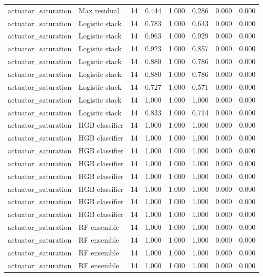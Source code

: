 {\begin{longtable}{llrrrrrr}
actuator\_saturation & Max residual & 14 & 0.444 & 1.000 & 0.286 & 0.000 & 0.000 \\
actuator\_saturation & Logistic stack & 14 & 0.783 & 1.000 & 0.643 & 0.000 & 0.000 \\
actuator\_saturation & Logistic stack & 14 & 0.963 & 1.000 & 0.929 & 0.000 & 0.000 \\
actuator\_saturation & Logistic stack & 14 & 0.923 & 1.000 & 0.857 & 0.000 & 0.000 \\
actuator\_saturation & Logistic stack & 14 & 0.880 & 1.000 & 0.786 & 0.000 & 0.000 \\
actuator\_saturation & Logistic stack & 14 & 0.880 & 1.000 & 0.786 & 0.000 & 0.000 \\
actuator\_saturation & Logistic stack & 14 & 0.727 & 1.000 & 0.571 & 0.000 & 0.000 \\
actuator\_saturation & Logistic stack & 14 & 1.000 & 1.000 & 1.000 & 0.000 & 0.000 \\
actuator\_saturation & Logistic stack & 14 & 0.833 & 1.000 & 0.714 & 0.000 & 0.000 \\
actuator\_saturation & HGB classifier & 14 & 1.000 & 1.000 & 1.000 & 0.000 & 0.000 \\
actuator\_saturation & HGB classifier & 14 & 1.000 & 1.000 & 1.000 & 0.000 & 0.000 \\
actuator\_saturation & HGB classifier & 14 & 1.000 & 1.000 & 1.000 & 0.000 & 0.000 \\
actuator\_saturation & HGB classifier & 14 & 1.000 & 1.000 & 1.000 & 0.000 & 0.000 \\
actuator\_saturation & HGB classifier & 14 & 1.000 & 1.000 & 1.000 & 0.000 & 0.000 \\
actuator\_saturation & HGB classifier & 14 & 1.000 & 1.000 & 1.000 & 0.000 & 0.000 \\
actuator\_saturation & HGB classifier & 14 & 1.000 & 1.000 & 1.000 & 0.000 & 0.000 \\
actuator\_saturation & HGB classifier & 14 & 1.000 & 1.000 & 1.000 & 0.000 & 0.000 \\
actuator\_saturation & RF ensemble & 14 & 1.000 & 1.000 & 1.000 & 0.000 & 0.000 \\
actuator\_saturation & RF ensemble & 14 & 1.000 & 1.000 & 1.000 & 0.000 & 0.000 \\
actuator\_saturation & RF ensemble & 14 & 1.000 & 1.000 & 1.000 & 0.000 & 0.000 \\
actuator\_saturation & RF ensemble & 14 & 1.000 & 1.000 & 1.000 & 0.000 & 0.000 \\

\end{longtable}}
